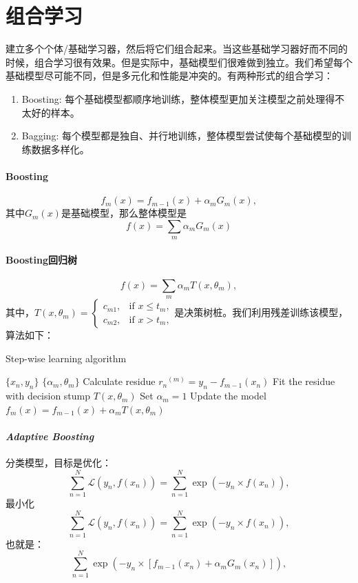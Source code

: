 \section{组合学习}
建立多个个体/基础学习器，然后将它们组合起来。当这些基础学习器好而不同的时候，组合学习很有效果。但是实际中，基础模型们很难做到独立。我们希望每个基础模型尽可能不同，但是多元化和性能是冲突的。有两种形式的组合学习：
\begin{enumerate}
    \item Boosting: 每个基础模型都顺序地训练，整体模型更加关注模型之前处理得不太好的样本。
    \item Bagging: 每个模型都是独自、并行地训练，整体模型尝试使每个基础模型的训练数据多样化。
\end{enumerate}

\paragraph{Boosting}
$$f_m(x) = f_{m-1}(x) + \alpha_mG_m(x),$$
其中$G_m(x)$是基础模型，那么整体模型是
$$f(x) = \sum_m \alpha_m G_m(x)$$

\paragraph{Boosting回归树}
$$f(x) = \sum_m \alpha_m T(x, \theta_m),$$
其中，$T(x,\theta_m)=\left\{\begin{array}{ll}
    c_{m1}, & \text{if }x \le t_m, \\
    c_{m2}, & \text{if }x > t_m,
\end{array} \right.$是决策树桩。我们利用残差训练该模型，算法如下：
\begin{algorithm}[H]
\caption{Step-wise learning algorithm}
\label{alg:step-wise}
\begin{algorithmic}[1]
\Require $\{x_n, y_n\}$
\Ensure $\{\alpha_m, \theta_m\}$
\State Calculate residue ${r_n}^{(m)} = y_n - f_{m-1}(x_n)$
\State Fit the residue with decision stump $T(x,\theta_m)$
\State Set $\alpha_m = 1$
\State Update the model $f_m(x) = f_{m-1}(x) + \alpha_mT(x, \theta_m)$
\EndFor
\end{algorithmic}
\end{algorithm}

\paragraph{\textit{Adaptive Boosting}}
分类模型，目标是优化：
$$\sum_{n=1}^N \mathcal{L}(y_n, f(x_n)) = \sum_{n=1}^N \exp(-y_n \times f(x_n)),$$
最小化$$\sum^N_{n=1} \mathcal{L}(y_n, f(x_n)) = \sum_{n=1}^N \exp(-y_n \times f(x_n)),$$也就是：
$$
\sum_{n=1}^N \exp(-y_n \times [f_{m-1}(x_n) + \alpha_mG_m(x_n)]),
$$

